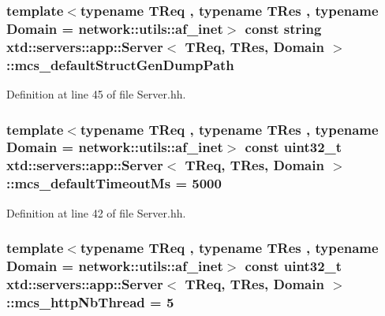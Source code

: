 \hypertarget{classxtd_1_1servers_1_1app_1_1Server_afae8d71c231f3e48ec8270217fddae10}{
\subsubsection[{mcs\-\_\-default\-Struct\-Gen\-Dump\-Path}]{\setlength{\rightskip}{0pt plus 5cm}template$<$typename T\-Req , typename T\-Res , typename Domain  = network\-::utils\-::af\-\_\-inet$>$ const string {\bf xtd\-::servers\-::app\-::\-Server}$<$ T\-Req, T\-Res, Domain $>$\-::mcs\-\_\-default\-Struct\-Gen\-Dump\-Path\hspace{0.3cm}{\ttfamily [static]}}}\label{classxtd_1_1servers_1_1app_1_1Server_afae8d71c231f3e48ec8270217fddae10}


Definition at line 45 of file Server.\-hh.

\hypertarget{classxtd_1_1servers_1_1app_1_1Server_a76f9b8224a5555f638527752e26d5457}{
\subsubsection[{mcs\-\_\-default\-Timeout\-Ms}]{\setlength{\rightskip}{0pt plus 5cm}template$<$typename T\-Req , typename T\-Res , typename Domain  = network\-::utils\-::af\-\_\-inet$>$ const uint32\-\_\-t {\bf xtd\-::servers\-::app\-::\-Server}$<$ T\-Req, T\-Res, Domain $>$\-::mcs\-\_\-default\-Timeout\-Ms = 5000\hspace{0.3cm}{\ttfamily [static]}}}\label{classxtd_1_1servers_1_1app_1_1Server_a76f9b8224a5555f638527752e26d5457}


Definition at line 42 of file Server.\-hh.

\hypertarget{classxtd_1_1servers_1_1app_1_1Server_ac9944d61cb7fd45d86c1128e1ac55670}{
\subsubsection[{mcs\-\_\-http\-Nb\-Thread}]{\setlength{\rightskip}{0pt plus 5cm}template$<$typename T\-Req , typename T\-Res , typename Domain  = network\-::utils\-::af\-\_\-inet$>$ const uint32\-\_\-t {\bf xtd\-::servers\-::app\-::\-Server}$<$ T\-Req, T\-Res, Domain $>$\-::mcs\-\_\-http\-Nb\-Thread = 5\hspace{0.3cm}{\ttfamily [static]}}}\label{classxtd_1_1servers_1_1app_1_1Server_ac9944d61cb7fd45d86c1128e1ac55670}


